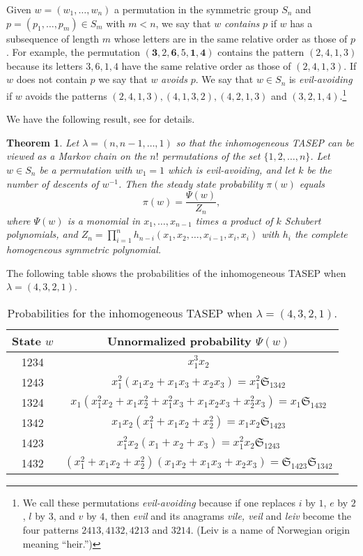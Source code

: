 \documentclass[11pt]{amsart}
\newcommand{\Sym}{\mathfrak{S}}
\newtheorem{theorem}{Theorem}[section]
\theoremstyle{definition}
\theoremstyle{remark}
\begin{document}
Given $w=(w_1,\dots,w_n)$ a permutation in the symmetric group $S_n$ and $p=(p_1,\dots,p_m)\in S_m$ with $m<n$, we say that $w$ \emph{contains} $p$ if $w$ has a 
subsequence of length $m$ whose letters are in the same relative order as those of $p$.
For example, the permutation $({\mathbf{3}}, 2, \mathbf{6}, 5, \mathbf{1} , \mathbf{4})$ contains the pattern
$(2,4,1,3)$ because its letters $3,6,1,4$ have the same relative 
order as those of $(2,4,1,3)$.
If $w$ does not contain $p$ we say that $w$ \emph{avoids} $p$.
We say that $w\in S_n$ is \emph{evil-avoiding} if $w$ avoids the patterns
$(2,4,1,3), (4,1,3,2), (4,2,1,3)$ and $(3,2,1,4)$.\footnote{We call these permutations \emph{evil-avoiding} because if one
replaces $i$ by $1$, $e$ by $2$, $l$ by $3$, and $v$ by $4$,
then \emph{evil} and its anagrams \emph{vile, veil} and \emph{leiv} become the four patterns $2413, 4132, 4213$ and $3214$.  (Leiv is a name of Norwegian origin meaning ``heir.'')}


We have the following result, see \cite{KW} for details.

\begin{theorem}\label{thm:KW}
Let $\lambda=(n,n-1,\dots,1)$ so that the inhomogeneous TASEP can be viewed
as a Markov chain on the $n!$ permutations of the set $\{1,2,\dots,n\}$.
Let $w\in S_n$ be a permutation with $w_1=1$ which is \emph{evil-avoiding}, and let
$k$ be the number of descents of $w^{-1}$.
	Then the steady state probability $\pi(w)$ 
	equals 
	$$\pi(w) = \frac{\Psi(w)}{Z_n},$$
	where $\Psi(w)$ is a monomial in $x_1,\dots,x_{n-1}$ 
times a product of $k$ Schubert polynomials,
and $Z_n = \prod_{i=1}^n h_{n-i}(x_1,x_2,\dots,x_{i-1},x_i,x_i)$
with $h_i$ the complete homogeneous symmetric polynomial.
\end{theorem}


The following table shows the  probabilities of the inhomogeneous 
TASEP when 
$\lambda=(4,3,2,1)$. 

\begin{table}[h]
\begin{tabular}{|c c| }
    \hline
	State $w$ & Unnormalized probability $\Psi(w)$\\
    \hline 
    1234 & $x_1^3  x_2$\\
	1243 & $x_1^2(x_1 x_2 + x_1 x_3+x_2 x_3) = x_1^2 \Sym_{1342}$\\
	1324 & $x_1(x_1^2 x_2 + x_1 x_2^2+x_1^2 x_3 + x_1 x_2 x_3 + x_2^2 x_3) =                  x_1 \Sym_{1432}$\\
	1342 & $x_1 x_2 (x_1^2+x_1 x_2 + x_2^2) = x_1 x_2 \Sym_{1423}$\\
	1423 & $x_1^2 x_2 (x_1+x_2+x_3) = x_1^2  x_2 \Sym_{1243}$\\
	1432 & $(x_1^2+x_1 x_2+x_2^2)(x_1 x_2+x_1 x_3+x_2 x_3) = \Sym_{1423} \Sym_{1342}$\\ 
    \hline
    \end{tabular}
	\caption{Probabilities for the 
	inhomogeneous TASEP when $\lambda=(4,3,2,1)$.}\label{table:3}
\end{table}
\end{document}
